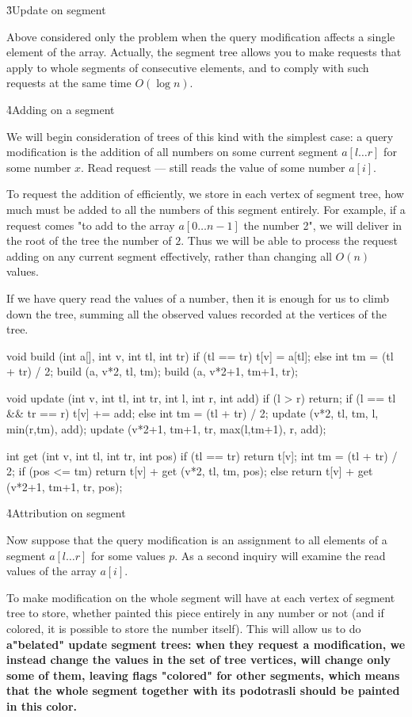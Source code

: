 \h3{Update on segment}

Above considered only the problem when the query modification affects a single element of the array. Actually, the segment tree allows you to make requests that apply to whole segments of consecutive elements, and to comply with such requests at the same time $O (\log n)$.

\h4{Adding on a segment}

We will begin consideration of trees of this kind with the simplest case: a query modification is the addition of all numbers on some current segment $a[l \ldots r]$ for some number $x$. Read request --- still reads the value of some number $a[i]$.

To request the addition of efficiently, we store in each vertex of segment tree, how much must be added to all the numbers of this segment entirely. For example, if a request comes "to add to the array $a[0 \ldots n-1]$ the number 2", we will deliver in the root of the tree the number of $2$. Thus we will be able to process the request adding on any current segment effectively, rather than changing all $O (n)$ values.

If we have query read the values of a number, then it is enough for us to climb down the tree, summing all the observed values recorded at the vertices of the tree.

\code
void build (int a[], int v, int tl, int tr) {
if (tl == tr)
t[v] = a[tl];
else {
int tm = (tl + tr) / 2;
build (a, v*2, tl, tm);
build (a, v*2+1, tm+1, tr);
}
}

void update (int v, int tl, int tr, int l, int r, int add) {
if (l > r)
return;
if (l == tl && tr == r)
t[v] += add;
else {
int tm = (tl + tr) / 2;
update (v*2, tl, tm, l, min(r,tm), add);
update (v*2+1, tm+1, tr, max(l,tm+1), r, add);
}
}

int get (int v, int tl, int tr, int pos) {
if (tl == tr)
return t[v];
int tm = (tl + tr) / 2;
if (pos <= tm)
return t[v] + get (v*2, tl, tm, pos);
else
return t[v] + get (v*2+1, tm+1, tr, pos);
}
\endcode

\h4{Attribution on segment}

Now suppose that the query modification is an assignment to all elements of a segment $a[l \ldots r]$ for some values $p$. As a second inquiry will examine the read values of the array $a[i]$.

To make modification on the whole segment will have at each vertex of segment tree to store, whether painted this piece entirely in any number or not (and if colored, it is possible to store the number itself). This will allow us to do \bf {a"belated" update} segment trees: when they request a modification, we instead change the values in the set of tree vertices, will change only some of them, leaving flags "colored" for other segments, which means that the whole segment together with its podotrasli should be painted in this color.

